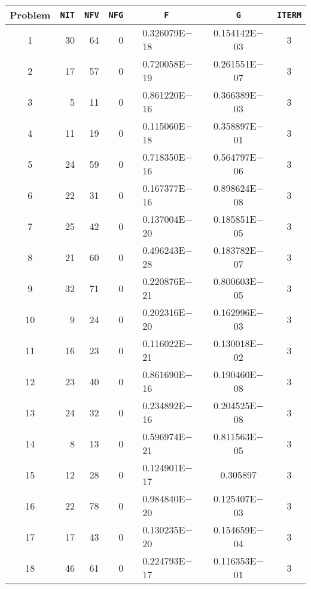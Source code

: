 \documentclass{esub2acm}
\begin{document}
\begin{table}
\footnotesize
\centering
\begin{tabular}{c|rrrr@{}lcc} \hline
Problem\rule[-2pt]{0pt}{12pt} & {\tt NIT} & {\tt NFV} & {\tt NFG} & \multicolumn{2}{c}{\tt F} & {\tt G} & {\tt ITERM} \\ \hline
1\rule[-2pt]{0pt}{12pt} &   30  &   64  &   0   &       &   0.326079E$-$18  &   0.154142E$-$03  &   3   \\
2   &   17  &   57  &   0   &       &   0.720058E$-$19  &   0.261551E$-$07  &   3   \\
3   &   5   &   11  &   0   &       &   0.861220E$-$16  &   0.366389E$-$03  &   3   \\
4   &   11  &   19  &   0   &       &   0.115060E$-$18  &   0.358897E$-$01  &   3   \\
5   &   24  &   59  &   0   &       &   0.718350E$-$16  &   0.564797E$-$06  &   3   \\
6   &   22  &   31  &   0   &       &   0.167377E$-$16  &   0.898624E$-$08  &   3   \\
7   &   25  &   42  &   0   &       &   0.137004E$-$20  &   0.185851E$-$05  &   3   \\
8   &   21  &   60  &   0   &       &   0.496243E$-$28  &   0.183782E$-$07  &   3   \\
9   &   32  &   71  &   0   &       &   0.220876E$-$21  &   0.800603E$-$05  &   3   \\
10  &   9   &   24  &   0   &       &   0.202316E$-$20  &   0.162996E$-$03  &   3   \\
11  &   16  &   23  &   0   &       &   0.116022E$-$21  &   0.130018E$-$02  &   3   \\
12  &   23  &   40  &   0   &       &   0.861690E$-$16  &   0.190460E$-$08  &   3   \\
13  &   24  &   32  &   0   &       &   0.234892E$-$16  &   0.204525E$-$08  &   3   \\
14  &   8   &   13  &   0   &       &   0.596974E$-$21  &   0.811563E$-$05  &   3   \\
15  &   12  &   28  &   0   &       &   0.124901E$-$17  &   0.305897    &   3   \\
16  &   22  &   78  &   0   &       &   0.984840E$-$20  &   0.125407E$-$03  &   3   \\
17  &   17  &   43  &   0   &       &   0.130235E$-$20  &   0.154659E$-$04  &   3   \\
18  &   46  &   61  &   0   &       &   0.224793E$-$17  &   0.116353E$-$01  &   3   \\

\end{tabular}
\end{table}
\end{document}
